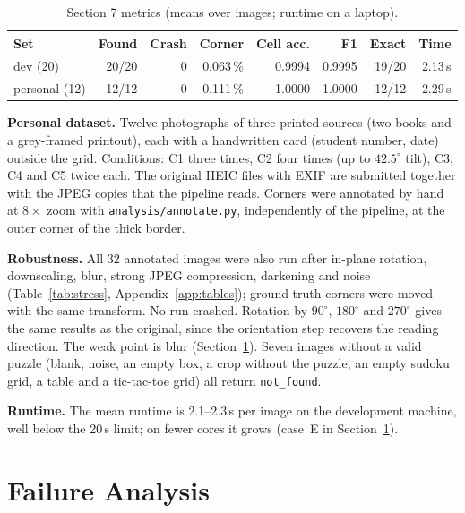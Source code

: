 \documentclass[conference]{IEEEtran}
\begin{document}
\begin{table}[t]
\centering\footnotesize
\caption{Section 7 metrics (means over images; runtime on a laptop).}
\label{tab:metrics}
\setlength{\tabcolsep}{3pt}
\begin{tabular}{@{}l r r r r r r r@{}}
\toprule
Set & Found & Crash & Corner & Cell acc. & F1 & Exact & Time\\
\midrule
dev (20) & 20/20 & 0 & 0.063\,\% & 0.9994 & 0.9995 & 19/20 & 2.13\,s\\
personal (12) & 12/12 & 0 & 0.111\,\% & 1.0000 & 1.0000 & 12/12 & 2.29\,s\\
\bottomrule
\end{tabular}
\end{table}



\textbf{Personal dataset.} Twelve photographs of three printed sources (two books and a grey-framed printout), each with a handwritten card (student number, date) outside the grid. Conditions: C1 three times, C2 four times (up to $42.5^\circ$ tilt), C3, C4 and C5 twice each. The original HEIC files with EXIF are submitted together with the JPEG copies that the pipeline reads. Corners were annotated by hand at $8\times$ zoom with \texttt{analysis/annotate.py}, independently of the pipeline, at the outer corner of the thick border.

\textbf{Robustness.} All 32 annotated images were also run after in-plane rotation, downscaling, blur, strong JPEG compression, darkening and noise (Table~\ref{tab:stress}, Appendix~\ref{app:tables}); ground-truth corners were moved with the same transform. No run crashed. Rotation by $90^\circ$, $180^\circ$ and $270^\circ$ gives the same results as the original, since the orientation step recovers the reading direction. The weak point is blur (Section~\ref{sec:failures}). Seven images without a valid puzzle (blank, noise, an empty box, a crop without the puzzle, an empty sudoku grid, a table and a tic-tac-toe grid) all return \texttt{not\_found}.



\textbf{Runtime.} The mean runtime is 2.1--2.3\,s per image on the development machine, well below the 20\,s limit; on fewer cores it grows (case~E in Section~\ref{sec:failures}).

\section{Failure Analysis}
\label{sec:failures}
\end{document}
